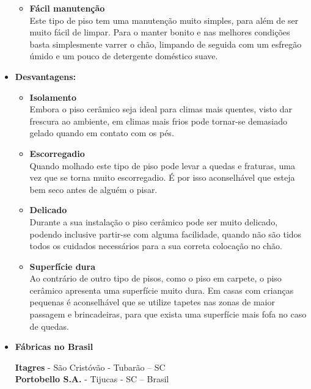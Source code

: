 \begin{itemize}
\begin{itemize}
\item \textbf{Fácil manutenção}\\Este tipo de piso tem uma manutenção muito simples, para além de ser muito fácil de limpar. Para o manter bonito e nas melhores condições basta simplesmente varrer o chão, limpando de seguida com um esfregão úmido e um pouco de detergente doméstico suave.

\end{itemize}
\item \textbf{Desvantagens:}

\begin{itemize}
\item \textbf{Isolamento}\\Embora o piso cerâmico seja ideal para climas mais quentes, visto dar frescura ao ambiente, em climas mais frios pode tornar-se demasiado gelado quando em contato com os pés.

\item \textbf{Escorregadio}\\Quando molhado este tipo de piso pode levar a quedas e fraturas, uma vez que se torna muito escorregadio. É por isso aconselhável que esteja bem seco antes de alguém o pisar.

\item \textbf{Delicado}\\Durante a sua instalação o piso cerâmico pode ser muito delicado, podendo inclusive partir-se com alguma facilidade, quando não são tidos todos os cuidados necessários para a sua correta colocação no chão.

\item \textbf{Superfície dura}\\Ao contrário de outro tipo de pisos, como o piso em carpete, o piso cerâmico apresenta uma superfície muito dura. Em casas com crianças pequenas é aconselhável que se utilize tapetes nas zonas de maior passagem e brincadeiras, para que exista uma superfície mais fofa no caso de quedas.

\end{itemize}


\item \textbf{Fábricas no Brasil}

\textbf{Itagres} - São Cristóvão - Tubarão – SC\\
\textbf{Portobello S.A.} - Tijucas - SC – Brasil

\end{itemize}

